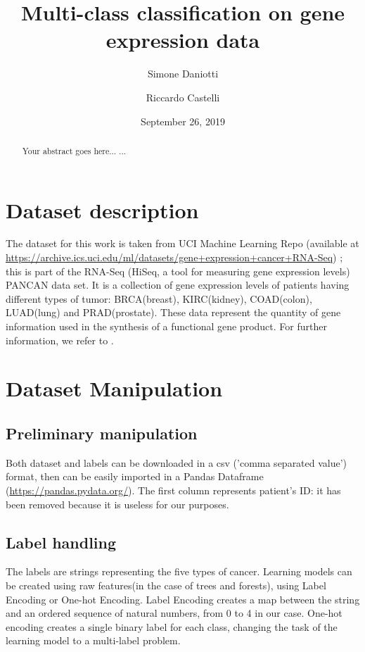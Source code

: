 \documentclass{article}
\title{Multi-class classification on gene expression data}
\author[1]{Simone Daniotti}
\author[2]{Riccardo Castelli}
\affil[1]{Physics Department, University of Milan}
\affil[2]{Informatics Department, University of Milan}
\date{September 26, 2019}                     %
\begin{document}
  \maketitle
  
  
\begin{abstract}
Your abstract goes here...
...
\end{abstract}

\tableofcontents


\section{Dataset description}

The dataset for this work is taken from UCI Machine Learning Repo (available at \url{https://archive.ics.uci.edu/ml/datasets/gene+expression+cancer+RNA-Seq}) \cite{Dua:2019}; this is part of the RNA-Seq (HiSeq, a tool for measuring gene expression levels) PANCAN data set. It is a collection of gene expression levels of patients having different types of tumor: BRCA(breast), KIRC(kidney), COAD(colon), LUAD(lung) and PRAD(prostate).
These data represent the quantity of gene information used in the synthesis of a functional gene product. For further information, we refer to \cite{weinstein2013cancer}.



\section{Dataset Manipulation}


\subsection{Preliminary manipulation}
Both dataset and labels can be downloaded in a csv ('comma separated value') format, then can be easily imported in a Pandas Dataframe (\url{https://pandas.pydata.org/}). The first column represents patient's ID: it has been removed because it is useless for our purposes.



\subsection{Label handling}
The labels are strings representing the five types of cancer. Learning models can be created using raw features(in the case of trees and forests), using Label Encoding or One-hot Encoding.
Label Encoding creates a map between the string and an ordered sequence of natural numbers, from 0 to 4 in our case.
One-hot encoding creates a single binary label for each class, changing the task of the learning model to a multi-label problem.
\end{document}
